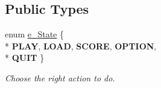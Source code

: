 \subsection*{Public Types}
\begin{DoxyCompactItemize}
\item 
\hypertarget{class_intro_state_a7548d047181ad60ba46a2325d040d14e}{}enum \hyperlink{class_intro_state_a7548d047181ad60ba46a2325d040d14e}{e\+\_\+\+State} \{ \\*
{\bfseries P\+L\+A\+Y}, 
{\bfseries L\+O\+A\+D}, 
{\bfseries S\+C\+O\+R\+E}, 
{\bfseries O\+P\+T\+I\+O\+N}, 
\\*
{\bfseries Q\+U\+I\+T}
 \}\label{class_intro_state_a7548d047181ad60ba46a2325d040d14e}

\begin{DoxyCompactList}\small\item\em Choose the right action to do. \end{DoxyCompactList}\end{DoxyCompactItemize}

